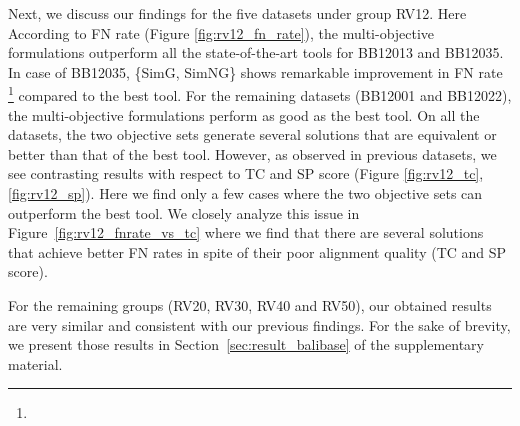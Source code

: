 Next, we discuss our findings for the five datasets under group RV12. Here According to FN rate (Figure \ref{fig:rv12_fn_rate}), the multi-objective formulations outperform all the state-of-the-art tools for BB12013 and BB12035. In case of BB12035, \{SimG, SimNG\} shows remarkable improvement in FN rate \footnote{} compared to the best tool. For the remaining datasets (BB12001 and BB12022), the multi-objective formulations perform as good as the best tool. On all the datasets, the two objective sets generate several solutions that are equivalent or better than that of the best tool.
However, as observed in previous datasets, we see contrasting results with respect to TC and SP score (Figure \ref{fig:rv12_tc},\ref{fig:rv12_sp}). Here we find only a few cases where the two objective sets can outperform the best tool. We closely analyze this issue in Figure~\ref{fig:rv12_fnrate_vs_tc} where we find that there are several solutions that achieve better FN rates in spite of their poor alignment quality (TC and SP score).


For the remaining groups (RV20, RV30, RV40 and RV50), our obtained results are very similar and consistent with our previous findings. For the sake of brevity, we present those results in Section~\ref{sec:result_balibase} of the supplementary material.


